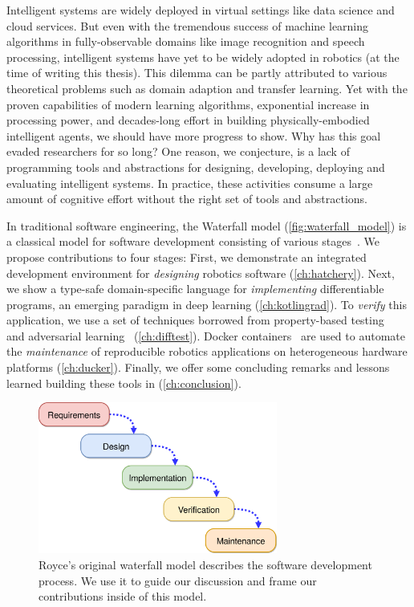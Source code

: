 Intelligent systems are widely deployed in virtual settings like data science and cloud services. But even with the tremendous success of machine learning algorithms in fully-observable domains like image recognition and speech processing, intelligent systems have yet to be widely adopted in robotics (at the time of writing this thesis). This dilemma can be partly attributed to various theoretical problems such as domain adaption and transfer learning. Yet with the proven capabilities of modern learning algorithms, exponential increase in processing power, and decades-long effort in building physically-embodied intelligent agents, we should have more progress to show. Why has this goal evaded researchers for so long? One reason, we conjecture, is a lack of programming tools and abstractions for designing, developing, deploying and evaluating intelligent systems. In practice, these activities consume a large amount of cognitive effort without the right set of tools and abstractions.

In traditional software engineering, the Waterfall model (\autoref{fig:waterfall_model}) is a classical model for software development consisting of various stages~\citep{royce1987managing}. We propose contributions to four stages: First, we demonstrate an integrated development environment for \textit{designing} robotics software (\autoref{ch:hatchery}). Next, we show a type-safe domain-specific language for \textit{implementing} differentiable programs, an emerging paradigm in deep learning (\autoref{ch:kotlingrad}). To \textit{verify} this application, we use a set of techniques borrowed from property-based testing~\citep{fink1997property} and adversarial learning~\citep{lowd2005adversarial} (\autoref{ch:difftest}). Docker containers~\citep{merkel2014docker} are used to automate the \textit{maintenance} of reproducible robotics applications on heterogeneous hardware platforms (\autoref{ch:ducker}). Finally, we offer some concluding remarks and lessons learned building these tools in (\autoref{ch:conclusion}).

\begin{figure}[H]
    \centering
    \includegraphics[width=0.70\textwidth]{../figures/waterfall_diagram.png}
    \caption{Royce's original waterfall model describes the software development process. We use it to guide our discussion and frame our contributions inside of this model.\vspace{-10pt}}
    \label{fig:waterfall_model}
\end{figure}

